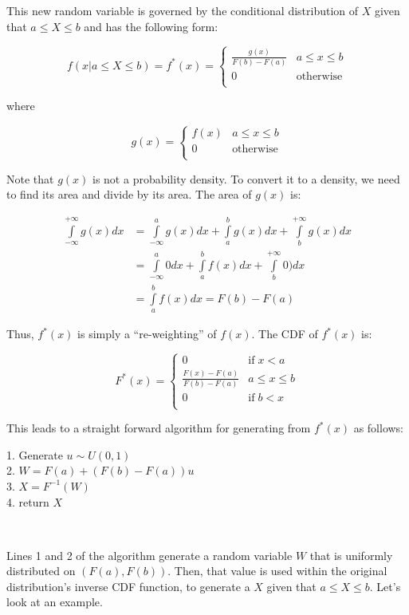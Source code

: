\documentclass[
]{book}
\theoremstyle{definition}
\theoremstyle{definition}
\theoremstyle{definition}
\theoremstyle{definition}
\theoremstyle{remark}
\begin{document}
This new random variable is governed by the conditional distribution of
\(X\) given that \(a \leq X \leq b\) and has the following form:

\[
f(x \vert a \leq X \leq b)  = f^{*}(x) = 
\begin{cases}
\frac{g(x)}{F(b) - F(a)} &  a \leq x \leq b\\
0 & \text{otherwise}\\
\end{cases}
\]

where

\[
g(x) =
\begin{cases}
f(x) &  a \leq x \leq b\\
0 & \text{otherwise}\\
\end{cases}
\]

Note that \(g(x)\) is not a probability density. To convert it to a
density, we need to find its area and divide by its area. The area of \(g(x)\) is:

\[
\begin{split}
\int\limits_{-\infty}^{+\infty} g(x) dx & = \int\limits_{-\infty}^{a} g(x) dx + \int\limits_{a}^{b} g(x) dx + \int\limits_{b}^{+\infty} g(x) dx \\
& = \int\limits_{-\infty}^{a} 0 dx + \int\limits_{a}^{b} f(x) dx + \int\limits_{b}^{+\infty} 0) dx \\
 & = \int\limits_{a}^{b} f(x) dx = F(b) - F(a)
\end{split}
\]

Thus, \(f^{*}(x)\) is simply a ``re-weighting'' of \(f(x)\). The CDF of
\(f^{*}(x)\) is:

\[
F^{*}(x) = 
\begin{cases}
0 & \text{if} \; x < a \\
\frac{F(x) - F(a)}{F(b) - F(a)} &   a \leq x \leq b\\
0 & \text{if} \; b < x\\
\end{cases}
\]

This leads to a straight forward algorithm for generating from
\(f^{*}(x)\) as follows:

1. Generate \(u \sim U(0,1)\)\\
2. \(W = F(a) + (F(b) - F(a))u\)\\
3. \(X = F^{-1}(W)\)\\
4. return \(X\)

~

Lines 1 and 2 of the algorithm generate a random variable \(W\) that is
uniformly distributed on \((F(a), F(b))\). Then, that value is used within
the original distribution's inverse CDF function, to generate a \(X\)
given that \(a \leq X \leq b\). Let's look at an example.
\end{document}
